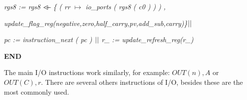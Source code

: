 \documentclass[11pt]{article} %
\begin{document}
\hspace*{0.40in}\it rgs8 \rm := \it rgs8  $\lover$  \rm \{ \rm ( \it rr  $\mapsto$  \it io\_ports \rm ( \it rgs8 \rm ( \it c0 \rm ) \rm ) \rm ) \rm ,

\hspace*{0.40in}\it update\_flag\_reg\rm (\it negative\rm,\it zero\rm,\it half\_carry\rm,\it pv\rm,\it add\_sub\rm,\it carry)\rm\}$\mbox{$\mid\mid$}$

\hspace*{0.40in}\it pc \rm := \it instruction\_next \rm ( \it pc \rm )  $\mbox{$\mid\mid$}$  \it r\_ \rm := \it update\_refresh\_reg\rm (\it r\_\rm )

\hspace*{0.0in}\bf END \rm

The main I/O instructions work similarly, for example: $\mathit{OUT(n),A}$  or
$\mathit{OUT (C ), r}$. There are several others instructions of I/O, besides these are
the most commonly used.

\end{document}
